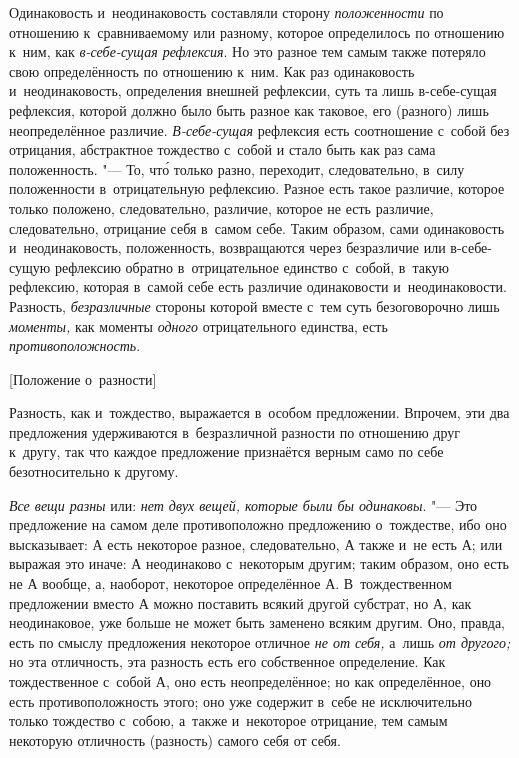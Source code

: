 Одинаковость и~неодинаковость составляли сторону
{\em положенности} по отношению к~сравниваемому или
разному, которое определилось по отношению к~ним, как
{\em в-себе-сущая рефлексия}. Но это разное тем самым
также потеряло свою определённость по отношению к~ним. Как раз одинаковость
и~неодинаковость, определения внешней рефлексии, суть та лишь в-себе-сущая
рефлексия, которой должно было быть разное как таковое, его (разного) лишь
неопределённое различие. {\em В-себе-сущая} рефлексия
есть соотношение с~собой без отрицания, абстрактное тождество с~собой и
стало быть как раз сама положенность. "--- То, чт\'{о} только разно, переходит,
следовательно, в~силу положенности в~отрицательную рефлексию. Разное есть
такое различие, которое только положено, следовательно, различие, которое
не есть различие, следовательно, отрицание себя в~самом себе. Таким
образом, сами одинаковость и~неодинаковость, положенность, возвращаются
через безразличие или в-себе-сущую рефлексию обратно в~отрицательное
единство с~собой, в~такую рефлексию, которая в~самой себе есть различие
одинаковости и~неодинаковости. Разность,
{\em безразличные} стороны которой вместе с~тем суть
безоговорочно лишь {\em моменты,} как моменты
{\em одного} отрицательного единства, есть {\em противоположность}.

%
  {[Положение о~разности]}

Разность, как и~тождество, выражается в~особом предложении. Впрочем, эти два
предложения удерживаются в~безразличной разности по отношению друг к~другу,
так что каждое предложение признаётся верным само по себе безотносительно к
другому.

{\em Все вещи разны} или: {\em нет
двух вещей, которые были бы одинаковы}. "--- Это предложение на самом деле
противоположно предложению о~тождестве, ибо оно высказывает: $А$
есть некоторое разное, следовательно, $А$ также и~не есть
$А$; или выражая это иначе: $А$ неодинаково с~некоторым
другим; таким образом, оно есть не $А$ вообще, а, наоборот,
некоторое определённое $А$. В~тождественном предложении вместо
$А$ можно поставить всякий другой субстрат, но $А$, как
неодинаковое, уже больше не может быть заменено всяким другим. Оно, правда,
есть по смыслу предложения некоторое отличное {\em не от себя,}
а~лишь {\em от другого;} но эта отличность,
эта разность есть его собственное определение. Как тождественное с~собой
$А$, оно есть неопределённое; но как определённое, оно есть
противоположность этого; оно уже содержит в~себе не исключительно только
тождество с~собою, а~также и~некоторое отрицание, тем самым некоторую
отличность (разность) самого себя от себя.


